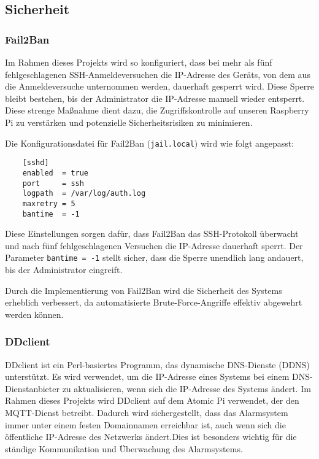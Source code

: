 
\subsection{Sicherheit}

\subsubsection{Fail2Ban}

Im Rahmen dieses Projekts wird  so konfiguriert, dass bei mehr als fünf fehlgeschlagenen SSH-Anmeldeversuchen die IP-Adresse des Geräts, von dem aus die Anmeldeversuche unternommen werden, dauerhaft gesperrt wird. Diese Sperre bleibt bestehen, bis der Administrator die IP-Adresse manuell wieder entsperrt. Diese strenge Maßnahme dient dazu, die Zugriffskontrolle auf unseren Raspberry Pi zu verstärken und potenzielle Sicherheitsrisiken zu minimieren.

Die Konfigurationsdatei für Fail2Ban (\texttt{jail.local}) wird wie folgt angepasst:

\begin{verbatim}
	[sshd]
	enabled  = true
	port     = ssh
	logpath  = /var/log/auth.log
	maxretry = 5
	bantime  = -1
\end{verbatim}

Diese Einstellungen sorgen dafür, dass Fail2Ban das SSH-Protokoll überwacht und nach fünf fehlgeschlagenen Versuchen die IP-Adresse dauerhaft sperrt. Der Parameter \texttt{bantime = -1} stellt sicher, dass die Sperre unendlich lang andauert, bis der Administrator eingreift.

Durch die Implementierung von Fail2Ban wird die Sicherheit des Systems erheblich verbessert, da automatisierte Brute-Force-Angriffe effektiv abgewehrt werden können.

\subsubsection{DDclient}

DDclient ist ein Perl-basiertes Programm, das dynamische DNS-Dienste (DDNS) unterstützt. Es wird verwendet, um die IP-Adresse eines Systems bei einem DNS-Dienstanbieter zu aktualisieren, wenn sich die IP-Adresse des Systems ändert. Im Rahmen dieses Projekts wird DDclient auf dem Atomic Pi verwendet, der den MQTT-Dienst betreibt. Dadurch wird sichergestellt, dass das Alarmsystem immer unter einem festen Domainnamen erreichbar ist, auch wenn sich die öffentliche IP-Adresse des Netzwerks ändert.Dies ist besonders wichtig für die ständige Kommunikation und Überwachung des Alarmsystems.


